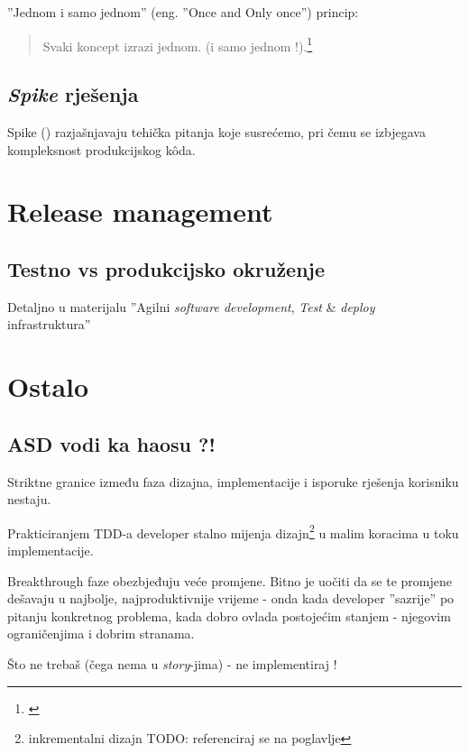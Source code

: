 \documentclass[lmodern, utf8, zavrsni]{fit}
\begin{document}
''Jednom i samo jednom'' (eng. ''Once and Only once'') princip:

\begin{quotation}
  Svaki koncept izrazi jednom. (i samo jednom !).\footnote{\citep[str. 319]{agileart}}
\end{quotation}

\section{\emph{Spike} rješenja}

Spike (\href{http://translate.google.com/#en/hr/spike}{\color{blue}{bos. ekser, smeč}}) razjašnjavaju tehička pitanja koje susrećemo, pri čemu se izbjegava kompleksnost produkcijskog k\^oda.\citep[str. 334]{agileart}

\chapter{Release management}

\section{Testno vs produkcijsko okruženje}

Detaljno u materijalu ''Agilni \emph{software development}, \emph{Test} \& \emph{deploy} infrastruktura''\citep{agiletestdeploy}

\chapter{Ostalo}

\section{ASD vodi ka haosu ?!}

Striktne granice između faza dizajna, implementacije i isporuke rješenja korisniku nestaju.

Prakticiranjem TDD-a developer stalno mijenja dizajn\footnote{inkrementalni dizajn TODO: referenciraj se na poglavlje} u malim koracima u toku implementacije.

Breakthrough faze obezbjeđuju veće promjene. Bitno je uočiti da se te promjene dešavaju u najbolje, najproduktivnije vrijeme - onda kada developer ''sazrije'' po pitanju konkretnog problema, kada dobro ovlada postojećim stanjem - njegovim ograničenjima i dobrim stranama.

Što ne trebaš (čega nema u \emph{story}-jima) - ne implementiraj !
\end{document}

